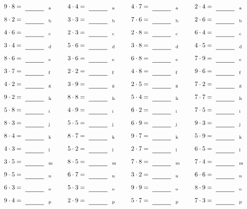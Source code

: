 \documentclass
[
  draft    = true,
  fontsize = 11pt,
  parskip  = half-
]
{scrartcl}
\begin{document}
\par\vfill\par
\begin{align*}
    \pline{9\cdot8}&=\rline{a}
  & \pline{4\cdot4}&=\rline{a}
  & \pline{4\cdot7}&=\rline{a}
  & \pline{2\cdot4}&=\rline{a} \\[1ex]
    \pline{8\cdot2}&=\rline{b}
  & \pline{3\cdot3}&=\rline{b}
  & \pline{7\cdot6}&=\rline{b}
  & \pline{2\cdot6}&=\rline{b} \\[1ex]
    \pline{4\cdot6}&=\rline{c}
  & \pline{2\cdot3}&=\rline{c}
  & \pline{2\cdot8}&=\rline{c}
  & \pline{6\cdot4}&=\rline{c} \\[1ex]
    \pline{3\cdot4}&=\rline{d}
  & \pline{5\cdot6}&=\rline{d}
  & \pline{3\cdot8}&=\rline{d}
  & \pline{4\cdot5}&=\rline{d} \\[1ex]
    \pline{8\cdot6}&=\rline{e}
  & \pline{3\cdot6}&=\rline{e}
  & \pline{6\cdot8}&=\rline{e}
  & \pline{7\cdot9}&=\rline{e} \\[1ex]
    \pline{3\cdot7}&=\rline{f}
  & \pline{2\cdot2}&=\rline{f}
  & \pline{4\cdot8}&=\rline{f}
  & \pline{9\cdot6}&=\rline{f} \\[1ex]
    \pline{4\cdot2}&=\rline{g}
  & \pline{3\cdot9}&=\rline{g}
  & \pline{2\cdot5}&=\rline{g}
  & \pline{7\cdot2}&=\rline{g} \\[1ex]
    \pline{9\cdot2}&=\rline{h}
  & \pline{8\cdot8}&=\rline{h}
  & \pline{5\cdot4}&=\rline{h}
  & \pline{7\cdot7}&=\rline{h} \\[1ex]
    \pline{5\cdot8}&=\rline{i}
  & \pline{4\cdot9}&=\rline{i}
  & \pline{6\cdot2}&=\rline{i}
  & \pline{7\cdot5}&=\rline{i} \\[1ex]
    \pline{8\cdot3}&=\rline{j}
  & \pline{5\cdot5}&=\rline{j}
  & \pline{6\cdot9}&=\rline{j}
  & \pline{9\cdot3}&=\rline{j} \\[1ex]
    \pline{8\cdot4}&=\rline{k}
  & \pline{8\cdot7}&=\rline{k}
  & \pline{9\cdot7}&=\rline{k}
  & \pline{5\cdot9}&=\rline{k} \\[1ex]
    \pline{4\cdot3}&=\rline{l}
  & \pline{5\cdot2}&=\rline{l}
  & \pline{2\cdot7}&=\rline{l}
  & \pline{6\cdot5}&=\rline{l} \\[1ex]
    \pline{3\cdot5}&=\rline{m}
  & \pline{8\cdot5}&=\rline{m}
  & \pline{7\cdot8}&=\rline{m}
  & \pline{7\cdot4}&=\rline{m} \\[1ex]
    \pline{9\cdot5}&=\rline{n}
  & \pline{6\cdot7}&=\rline{n}
  & \pline{3\cdot2}&=\rline{n}
  & \pline{6\cdot6}&=\rline{n} \\[1ex]
    \pline{6\cdot3}&=\rline{o}
  & \pline{5\cdot3}&=\rline{o}
  & \pline{9\cdot9}&=\rline{o}
  & \pline{8\cdot9}&=\rline{o} \\[1ex]
    \pline{9\cdot4}&=\rline{p}
  & \pline{2\cdot9}&=\rline{p}
  & \pline{5\cdot7}&=\rline{p}
  & \pline{7\cdot3}&=\rline{p}
\end{align*}
\end{document}
